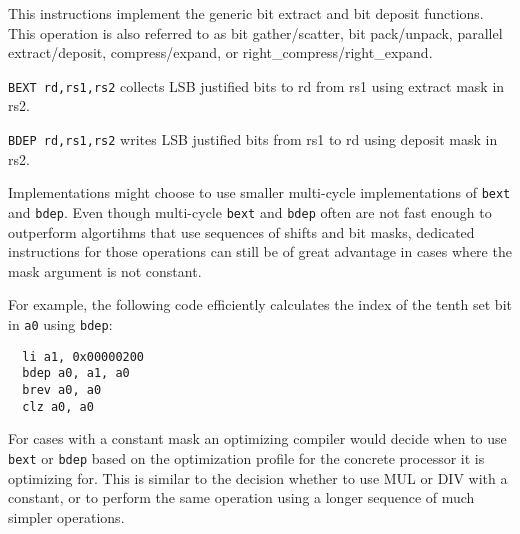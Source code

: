 This instructions implement the generic bit extract and bit deposit functions.
This operation is also referred to as bit gather/scatter, bit pack/unpack,
parallel extract/deposit, compress/expand, or right\_compress/right\_expand.

\texttt{BEXT rd,rs1,rs2} collects LSB justified bits to rd from
rs1 using extract mask in rs2.

\texttt{BDEP rd,rs1,rs2} writes LSB justified bits from rs1 to rd using
deposit mask in rs2.



Implementations might choose to use smaller multi-cycle implementations of
\texttt{bext} and \texttt{bdep}. Even though multi-cycle \texttt{bext} and
\texttt{bdep} often are not fast enough to outperform algortihms that use
sequences of shifts and bit masks, dedicated instructions for those operations
can still be of great advantage in cases where the mask argument is not
constant.

For example, the following code efficiently calculates the index of the tenth
set bit in {\tt a0} using \texttt{bdep}:

\begin{verbatim}
  li a1, 0x00000200
  bdep a0, a1, a0
  brev a0, a0
  clz a0, a0
\end{verbatim}

For cases with a constant mask an optimizing compiler would decide when to use
\texttt{bext} or \texttt{bdep} based on the optimization profile for the
concrete processor it is optimizing for. This is similar to the decision
whether to use MUL or DIV with a constant, or to perform the same operation
using a longer sequence of much simpler operations.



%
%
%
%
%
%
%
%
%

